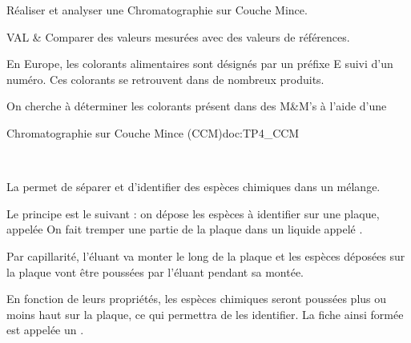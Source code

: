 \teteSndCorp

\nomPrenomClasse
{}


\begin{objectifs}
  \item Réaliser et analyser une Chromatographie sur Couche Mince.
\end{objectifs}


\begin{tableauCompetences}
  VAL & Comparer des valeurs mesurées avec des valeurs de références.
\end{tableauCompetences}



\begin{contexte}
  En Europe, les colorants alimentaires sont désignés par un préfixe E suivi d'un numéro.
  Ces colorants se retrouvent dans de nombreux produits.
  
  On cherche à déterminer les colorants présent dans des M\&M's à l'aide d'une 
\end{contexte}


\begin{doc}{Chromatographie sur Couche Mince (CCM)}{doc:TP4_CCM}
  \begin{figure}
    \centering
    \vspace*{-16pt}
     \\
  \end{figure}

  La  permet de séparer et d'identifier des espèces chimiques dans un mélange.

  Le principe est le suivant : on dépose les espèces à identifier sur une plaque, appelée  On fait tremper une partie de la plaque dans un liquide appelé .
  
  Par capillarité, l'éluant va monter le long de la plaque et les espèces déposées sur la plaque vont être poussées par l'éluant pendant sa montée.
  
  En fonction de leurs propriétés, les espèces chimiques seront poussées plus ou moins haut sur la plaque, ce qui permettra de les identifier.
  La fiche ainsi formée est appelée un .
\end{doc}

